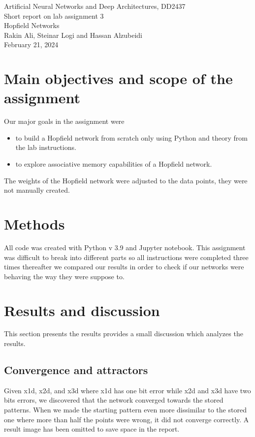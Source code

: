 \documentclass[a4paper]{article}
\begin{document}
\begin{center}
  {\large Artificial Neural Networks and Deep Architectures, DD2437}\\
  \vspace{7mm}
  {\huge Short report on lab assignment 3\\[1ex]}
  {\Large Hopfield Networks}\\
  \vspace{8mm}  
  {\Large Rakin Ali, Steinar Logi and Hassan Alzubeidi\\}
  \vspace{4mm}
  {\large February 21, 2024\\}
\end{center}

\section{Main objectives and scope of the assignment}
Our major goals in the assignment were  
\begin{itemize}
\item to build a Hopfield network from scratch only using Python and theory from the lab instructions.
\item to explore associative memory capabilities of a Hopfield network.
\end{itemize}

The weights of the Hopfield network were adjusted to the data points, they were not manually created.

\section{Methods}
All code was created with Python v 3.9 and Jupyter notebook. This assignment was difficult to break into different parts so all instructions were completed three times thereafter we compared our results in order to check if our networks were behaving the way they were suppose to. 

\section{Results and discussion}
This section presents the results provides a small discussion which analyzes the results.

\subsection{Convergence and attractors}
Given x1d, x2d, and x3d where x1d has one bit error while x2d and x3d have two bits errors, we discovered that the network converged towards the stored patterns. When we made the starting pattern even more dissimilar to the stored one where more than half the points were wrong, it did not converge correctly. A result image has been omitted to save space in the report.
\end{document}
